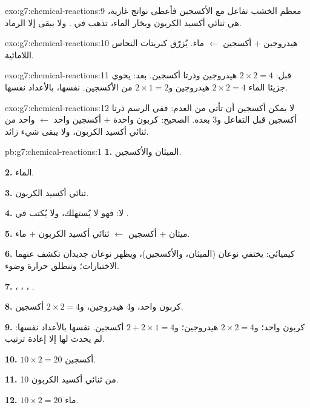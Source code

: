 \begin{solution}{exo:g7:chemical-reactions:9}
معظم الخشب تفاعل مع الأكسجين فأعطى نواتج غازية، هي ثنائي أكسيد الكربون
وبخار الماء، تذهب في . ولا يبقى إلا
الرماد.
\end{solution}

\begin{solution}{exo:g7:chemical-reactions:10}
هيدروجين $+$ أكسجين $\longleftarrow$ ماء.  يُزرّق كبريتات النحاس
اللامائية.
\end{solution}

\begin{solution}{exo:g7:chemical-reactions:11}
قبل: $2 \times 2 = 4$  هيدروجين وذرتا أكسجين. بعد: يحوي جزيئا
الماء $2 \times 2 = 4$  هيدروجين و$2 \times 1 =
2$ من  الأكسجين.  نفسها، بالأعداد نفسها.
\end{solution}

\begin{solution}{exo:g7:chemical-reactions:12}
لا يمكن  أكسجين أن تأتي من العدم: ففي الرسم ذرتا أكسجين قبل التفاعل
و3 بعده. الصحيح:  كربون واحدة $+$  أكسجين واحد
$\longleftarrow$  واحد من ثنائي أكسيد الكربون، ولا يبقى شيء زائد.
\end{solution}

\begin{solution}{pb:g7:chemical-reactions:1}
\textbf{1.} الميثان والأكسجين.

\textbf{2.} الماء.

\textbf{3.} ثنائي أكسيد الكربون.

\textbf{4.} لا: فهو لا يُستهلك، ولا يُكتب في .

\textbf{5.} ميثان $+$ أكسجين $\longleftarrow$ ثنائي أكسيد الكربون $+$
ماء.

\textbf{6.} كيميائي: يختفي نوعان (الميثان، والأكسجين)، ويظهر نوعان
جديدان تكشف عنهما الاختبارات؛ وتنطلق حرارة وضوء.

\textbf{7.} ، ، ، .

\textbf{8.} كربون واحد، و4 هيدروجين، و$2 \times 2 = 4$ أكسجين.

\textbf{9.} كربون واحد؛ و$2 \times 2 = 4$ هيدروجين؛ و$2 + 2 \times 1 = 4$
أكسجين.  نفسها بالأعداد نفسها: لم يحدث لها إلا إعادة
ترتيب.

\textbf{10.} $10 \times 2 = 20$  أكسجين.

\textbf{11.} 10  من ثنائي أكسيد الكربون.

\textbf{12.} $10 \times 2 = 20$  ماء.
\end{solution}
